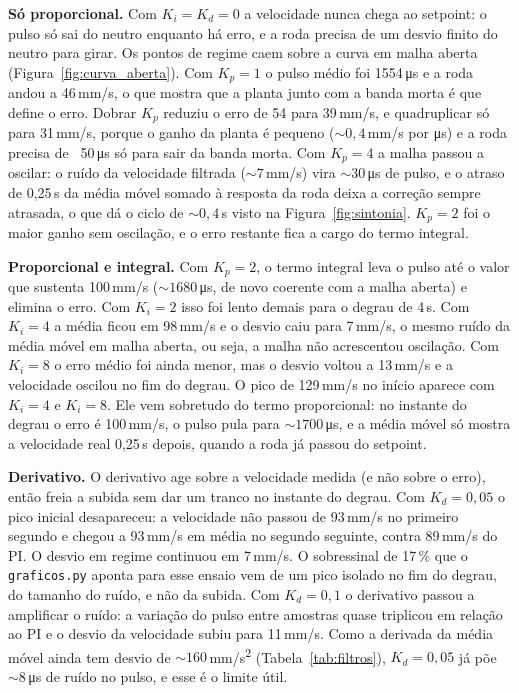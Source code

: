 \documentclass[12pt]{article}
\begin{document}
\textbf{Só proporcional.} Com $K_i = K_d = 0$ a velocidade nunca chega ao setpoint: o pulso só sai do neutro enquanto há erro, e a roda precisa de um desvio finito do neutro para girar. Os pontos de regime caem sobre a curva em malha aberta (Figura~\ref{fig:curva_aberta}). Com $K_p = 1$ o pulso médio foi 1554\,\si{\micro\second} e a roda andou a 46\,mm/s, o que mostra que a planta junto com a banda morta é que define o erro. Dobrar $K_p$ reduziu o erro de 54 para 39\,mm/s, e quadruplicar só para 31\,mm/s, porque o ganho da planta é pequeno (${\sim}0{,}4$\,mm/s por \si{\micro\second}) e a roda precisa de ~50\,\si{\micro\second} só para sair da banda morta. Com $K_p = 4$ a malha passou a oscilar: o ruído da velocidade filtrada (${\sim}7$\,mm/s) vira ${\sim}30$\,\si{\micro\second} de pulso, e o atraso de 0,25\,s da média móvel somado à resposta da roda deixa a correção sempre atrasada, o que dá o ciclo de ${\sim}0{,}4$\,s visto na Figura~\ref{fig:sintonia}. $K_p = 2$ foi o maior ganho sem oscilação, e o erro restante fica a cargo do termo integral.

\textbf{Proporcional e integral.} Com $K_p = 2$, o termo integral leva o pulso até o valor que sustenta 100\,mm/s (${\sim}1680$\,\si{\micro\second}, de novo coerente com a malha aberta) e elimina o erro. Com $K_i = 2$ isso foi lento demais para o degrau de 4\,s. Com $K_i = 4$ a média ficou em 98\,mm/s e o desvio caiu para 7\,mm/s, o mesmo ruído da média móvel em malha aberta, ou seja, a malha não acrescentou oscilação. Com $K_i = 8$ o erro médio foi ainda menor, mas o desvio voltou a 13\,mm/s e a velocidade oscilou no fim do degrau. O pico de 129\,mm/s no início aparece com $K_i = 4$ e $K_i = 8$. Ele vem sobretudo do termo proporcional: no instante do degrau o erro é 100\,mm/s, o pulso pula para ${\sim}1700$\,\si{\micro\second}, e a média móvel só mostra a velocidade real 0,25\,s depois, quando a roda já passou do setpoint.

\textbf{Derivativo.} O derivativo age sobre a velocidade medida (e não sobre o erro), então freia a subida sem dar um tranco no instante do degrau. Com $K_d = 0{,}05$ o pico inicial desapareceu: a velocidade não passou de 93\,mm/s no primeiro segundo e chegou a 93\,mm/s em média no segundo seguinte, contra 89\,mm/s do PI. O desvio em regime continuou em 7\,mm/s. O sobressinal de 17\,\% que o \texttt{graficos.py} aponta para esse ensaio vem de um pico isolado no fim do degrau, do tamanho do ruído, e não da subida. Com $K_d = 0{,}1$ o derivativo passou a amplificar o ruído: a variação do pulso entre amostras quase triplicou em relação ao PI e o desvio da velocidade subiu para 11\,mm/s. Como a derivada da média móvel ainda tem desvio de ${\sim}160$\,mm/s\textsuperscript{2} (Tabela~\ref{tab:filtros}), $K_d = 0{,}05$ já põe ${\sim}8$\,\si{\micro\second} de ruído no pulso, e esse é o limite útil.
\end{document}
